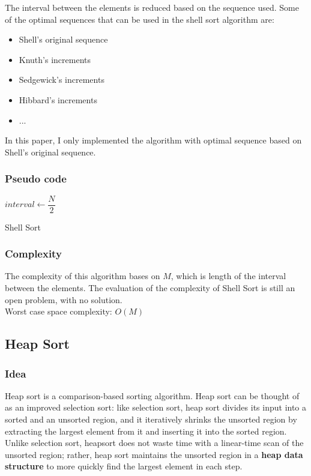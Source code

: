 \documentclass[11pt,a4paper]{article}
\newcommand\tab[1][1cm]{\hspace*{#1}}
\begin{document}
The interval between the elements is reduced based on the sequence used. 
Some of the optimal sequences that can be used in the shell sort algorithm are:
\begin{itemize}
\item Shell's original sequence
\item Knuth's increments
\item Sedgewick's increments
\item Hibbard's increments
\item ...
\end{itemize}

In this paper, I only implemented the algorithm with optimal sequence based on Shell's original sequence.

\subsubsection*{Pseudo code}
\begin{algorithm2e}
  \SetAlgoLined
  $interval \gets \dfrac{N}{2}$\\
  \caption{Shell Sort}
\end{algorithm2e}

\subsubsection*{Complexity}
The complexity of this algorithm bases on $M$, which is length of the interval between the elements.
The evaluation of the complexity of Shell Sort is still an open problem, with no solution.\\
Worst case space complexity: $O(M)$

\subsection{Heap Sort}
\subsubsection*{Idea}
Heap sort is a comparison-based sorting algorithm. 
Heap sort can be thought of as an improved selection sort: like selection sort, heap sort divides its input into a sorted and an unsorted region, and it iteratively shrinks the unsorted region by extracting the largest element from it and inserting it into the sorted region. 
\newline
\tab Unlike selection sort, heapsort does not waste time with a linear-time scan of the unsorted region; rather, heap sort maintains the unsorted region 
in a \textbf{heap data structure} to more quickly find the largest element in each step.
\end{document}
